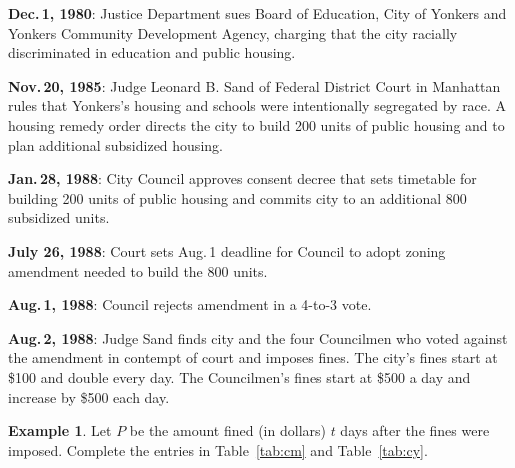 \documentclass[11pt]{amsart}
\theoremstyle{definition}
\newtheorem{ex}{Example}
\begin{document}
\begin{framed}
{\selectfont \small{
		\textbf{Dec.\,1, 1980}: Justice Department sues Board of Education, City of Yonkers and Yonkers Community Development Agency, charging that the city racially discriminated in education and public housing.

\textbf{Nov.\,20, 1985}: Judge Leonard B. Sand of Federal District Court in Manhattan rules that Yonkers's housing and schools were intentionally segregated by race. A housing remedy order directs the city to build 200 units of public housing and to plan additional subsidized housing.

\textbf{Jan.\,28, 1988}: City Council approves consent decree that sets timetable for building 200 units of public housing and commits city to an additional 800 subsidized units.

\textbf{July 26, 1988}: Court sets Aug.\,1 deadline for Council to adopt zoning amendment needed to build the 800 units.

\textbf{Aug.\,1, 1988}: Council rejects amendment in a 4-to-3 vote.

\textbf{Aug.\,2, 1988}: Judge Sand finds city and the four Councilmen who voted against the amendment in contempt of court and imposes fines. The city's fines start at \$100 and double every day. The Councilmen's fines start at \$500 a day and increase by \$500 each day.
}}
\end{framed}

\vspace{11pt}

\begin{ex}
 Let $P$ be the amount fined (in dollars) $t$ days after the fines were imposed. Complete the entries in Table~\ref{tab:cm} and Table~\ref{tab:cy}.

\end{ex}
\renewcommand{\arraystretch}{1.5}
\end{document}
